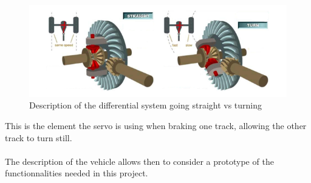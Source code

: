 \begin{figure}[H]
	\centering
	\includegraphics[scale=0.7]{figures/diffGearFull}
	\caption{Description of the differential system going straight vs turning \cite{MechanicalEngineering}}
	\label{diffGearFull}
\end{figure}

This is the element the servo is using when braking one track, allowing the other track to turn still.\\\\



The description of the vehicle allows then to consider a prototype of the functionnalities needed in this project.


